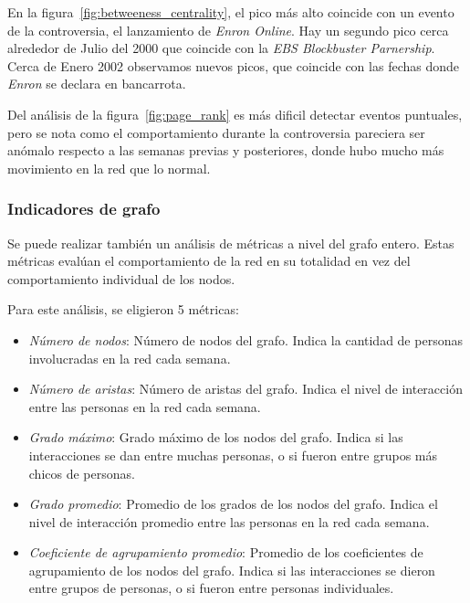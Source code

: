 \documentclass{article}
\begin{document}
En la figura~\ref{fig:betweeness_centrality}, el pico más alto coincide con un evento de la controversia, el lanzamiento de \emph{Enron Online}. Hay un segundo pico cerca alrededor de Julio del 2000 que coincide con la \emph{EBS Blockbuster Parnership}. Cerca de Enero 2002 observamos nuevos picos, que coincide con las fechas donde \emph{Enron} se declara en bancarrota.

Del análisis de la figura~\ref{fig:page_rank} es más dificil detectar eventos puntuales, pero se nota como el comportamiento durante la controversia pareciera ser anómalo respecto a las semanas previas y posteriores, donde hubo mucho más movimiento en la red que lo normal.

\subsubsection{Indicadores de grafo}

Se puede realizar también un análisis de métricas a nivel del grafo entero. Estas métricas evalúan el comportamiento de la red en su totalidad en vez del comportamiento individual de los nodos.

Para este análisis, se eligieron 5 métricas:
\begin{itemize}
    \item \emph{Número de nodos}: Número de nodos del grafo. Indica la cantidad de personas involucradas en la red cada semana.
    \item \emph{Número de aristas}: Número de aristas del grafo. Indica el nivel de interacción entre las personas en la red cada semana.
    \item \emph{Grado máximo}: Grado máximo de los nodos del grafo. Indica si las interacciones se dan entre muchas personas, o si fueron entre grupos más chicos de personas.
    \item \emph{Grado promedio}: Promedio de los grados de los nodos del grafo. Indica el nivel de interacción promedio entre las personas en la red cada semana.
    \item \emph{Coeficiente de agrupamiento promedio}: Promedio de los coeficientes de agrupamiento de los nodos del grafo. Indica si las interacciones se dieron entre grupos de personas, o si fueron entre personas individuales.
\end{itemize}
\end{document}
